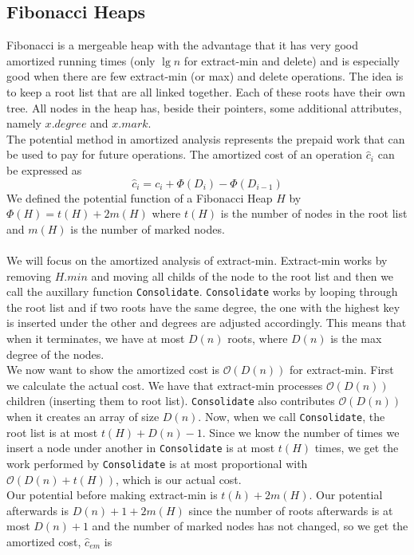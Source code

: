 \documentclass[a4paper]{article}
\author{Nikolaj Dybdahl Rathcke (rfq695)}
\begin{document}
\begin{center}
  \section*{Fibonacci Heaps}
\end{center}
Fibonacci is a mergeable heap with the advantage that it has very good amortized running times (only $\lg n$ for extract-min and delete) and is especially good when there are few extract-min (or max) and delete operations. The idea is to keep a root list that are all linked together. Each of these roots have their own tree. All nodes in the heap has, beside their pointers, some additional attributes, namely $x.degree$ and $x.mark$. \\
The potential method in amortized analysis represents the prepaid work that can be used to pay for future operations. The amortized cost of an operation $\hat{c}_i$ can be expressed as
$$\hat{c}_i=c_i+\Phi(D_i)-\Phi(D_{i-1})$$
We defined the potential function of a Fibonacci Heap $H$ by $\Phi(H)=t(H)+2m(H)$ where $t(H)$ is the number of nodes in the root list and $m(H)$ is the number of marked nodes. \\
\\
We will focus on the amortized analysis of extract-min. Extract-min works by removing $H.min$ and moving all childs of the node to the root list and then we call the auxillary function \texttt{Consolidate}. \texttt{Consolidate} works by looping through the root list and if two roots have the same degree, the one with the highest key is inserted under the other and degrees are adjusted accordingly. This means that when it terminates, we have at most $D(n)$ roots, where $D(n)$ is the max degree of the nodes.\\
We now want to show the amortized cost is $\mathcal{O}(D(n))$ for extract-min. First we calculate the actual cost. We have that extract-min processes $\mathcal{O}(D(n))$ children (inserting them to root list). \texttt{Consolidate} also contributes $\mathcal{O}(D(n))$ when it creates an array of size $D(n)$. Now, when we call \texttt{Consolidate}, the root list is at most $t(H)+D(n)-1$. Since we know the number of times we insert a node under another in \texttt{Consolidate} is at most $t(H)$ times, we get the work performed by \texttt{Consolidate} is at most proportional with $\mathcal{O}(D(n)+t(H))$, which is our actual cost. \\
Our potential before making extract-min is $t(h)+2m(H)$. Our potential afterwards is $D(n)+1+2m(H)$ since the number of roots afterwards is at most $D(n)+1$ and the number of marked nodes has not changed, so we get the amortized cost, $\hat{c}_{em}$ is
\end{document}
